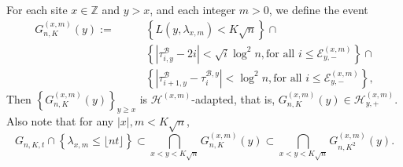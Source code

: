 \documentclass[EJP]{ejpecp} %
\newcommand{\abs}[1]{\left\vert #1 \right\vert}
\begin{document}
For each site $x \in \mathbb{Z}$ and $y > x$, and each integer $m > 0$, we define the event
\begin{align}
	G_{n,K}^{(x,m)}(y) :=  \qquad
	\label{eq:good-event-5}
	& \left\{L(y,\lambda_{x,m})  < K \sqrt{n} \right\} \cap \\
	\label{eq:good-event-6}
	& \left\{\left| \tau_{i,y}^{\mathscr{B}} - 2 i \right| < \sqrt{ i } \log^2 n, \mbox{for all $i\leq  \mathcal{E}_{y,-}^{(x,m)}$} \right\}  \cap \\
	\label{eq:good-event-7}
	& \left\{\left| \tau_{i+1,y}^{\mathscr{B}} - \tau_i^{\mathscr{B},y} \right| < \log^2 n,  \mbox{for all $i\leq  \mathcal{E}_{y,-}^{(x,m)}$}  \right\}  
	,\end{align}
Then  $\left\{G_{n, K}^{(x,m)}(y)\right\}_{y \ge x}$ is $\mathcal{H}^{(x,m)}$-adapted, that is, $G_{n, K}^{(x,m)}(y)\in \mathcal{H}_{y, +}^{(x,m)}$.
Also note that for any $ \abs{x},m < K\sqrt{n}$, 
\begin{equation}
	\label{eq:goodgood}
	G_{n, K, t}\cap \left\{ \lambda_{x,m} \leq\lfloor nt \rfloor \right\} 
	\subset   \bigcap_{x<y< K \sqrt{n} } G_{n, K}^{(x,m)}(y) 
	\subset   \bigcap_{x<y< K \sqrt{n} } G_{n, K^2}^{(x,m)}(y)
	.\end{equation} 
\end{document}
